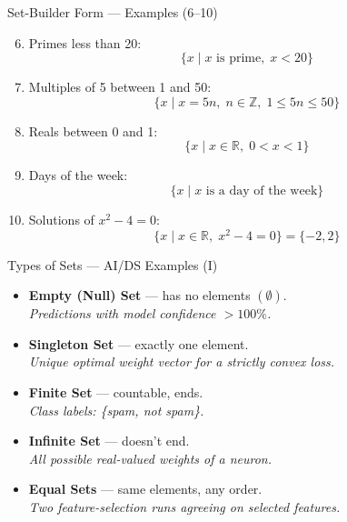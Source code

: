 \documentclass{beamer}
\begin{document}
\begin{frame}{Set-Builder Form --- Examples (6--10)}

\begin{enumerate}
    \setcounter{enumi}{5}
    \item Primes less than 20:
    \[
    \{x \mid x \text{ is prime},\; x < 20\}
    \]
    \item Multiples of 5 between 1 and 50:
    \[
    \{x \mid x = 5n,\; n \in \mathbb{Z},\; 1 \leq 5n \leq 50\}
    \]
    \item Reals between 0 and 1:
    \[
    \{x \mid x \in \mathbb{R},\; 0 < x < 1\}
    \]
    \item Days of the week:
    \[
    \{x \mid x \text{ is a day of the week}\}
    \]
    \item Solutions of $x^2 - 4 = 0$:
    \[
    \{x \mid x \in \mathbb{R},\; x^2 - 4 = 0\} = \{-2, 2\}
    \]
\end{enumerate}

\end{frame}

\begin{frame}{Types of Sets --- AI/DS Examples (I)}

\begin{itemize}
    \item \textbf{Empty (Null) Set} --- has no elements $(\emptyset)$. \\
    \textit{Predictions with model confidence $>100\%$.}
    \vspace{0.15cm}
    \item \textbf{Singleton Set} --- exactly one element. \\
    \textit{Unique optimal weight vector for a strictly convex loss.}
    \vspace{0.15cm}
    \item \textbf{Finite Set} --- countable, ends. \\
    \textit{Class labels: \{spam, not spam\}.}
    \vspace{0.15cm}
    \item \textbf{Infinite Set} --- doesn't end. \\
    \textit{All possible real-valued weights of a neuron.}
    \vspace{0.15cm}
    \item \textbf{Equal Sets} --- same elements, any order. \\
    \textit{Two feature-selection runs agreeing on selected features.}
\end{itemize}

\end{frame}
\end{document}
